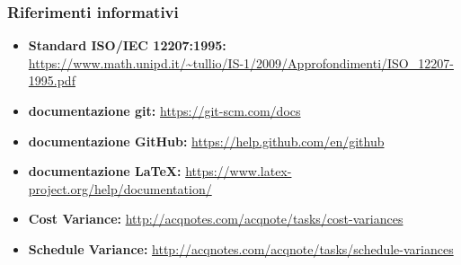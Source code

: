 		\subsubsection{Riferimenti informativi}
			\begin{itemize}
				\item \textbf{Standard ISO/IEC 12207:1995: } \\
				\url{https://www.math.unipd.it/~tullio/IS-1/2009/Approfondimenti/ISO_12207-1995.pdf}
				\item \textbf{documentazione git: }\url{https://git-scm.com/docs} 
				\item \textbf{documentazione GitHub: }\url{https://help.github.com/en/github}
				\item \textbf{documentazione LaTeX: }\url{https://www.latex-project.org/help/documentation/}
				\item \textbf{Cost Variance: } \url{http://acqnotes.com/acqnote/tasks/cost-variances}
				\item \textbf{Schedule Variance: } \url{http://acqnotes.com/acqnote/tasks/schedule-variances}
			\end{itemize}
		

